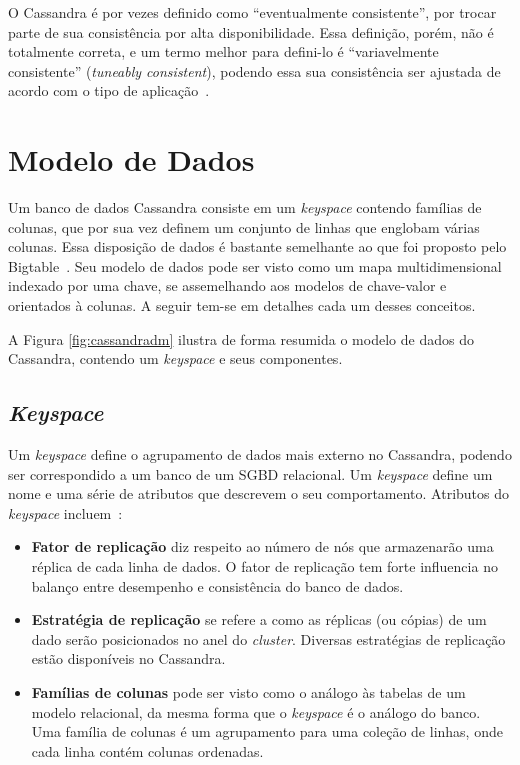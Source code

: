 O Cassandra é por vezes definido como \enquote{eventualmente consistente}, por trocar parte de sua consistência por alta disponibilidade. Essa definição, porém, não é totalmente correta, e um termo melhor para defini-lo é \enquote{variavelmente consistente} (\emph{tuneably consistent}), podendo essa sua consistência ser ajustada de acordo com o tipo de aplicação~\cite{cassandraguide}.

\section{Modelo de Dados}

Um banco de dados Cassandra consiste em um \emph{keyspace} contendo famílias de colunas, que por sua vez definem um conjunto de linhas que englobam várias colunas. Essa disposição de dados é bastante semelhante ao que foi proposto pelo Bigtable~\cite{lakshmancassandra, bigtable}. Seu modelo de dados pode ser visto como um mapa multidimensional indexado por uma chave, se assemelhando aos modelos de chave-valor e orientados à colunas. A seguir tem-se em detalhes cada um desses conceitos.

A Figura \ref{fig:cassandradm} ilustra de forma resumida o modelo de dados do Cassandra, contendo um \emph{keyspace} e seus componentes. 


\subsection*{\emph{Keyspace}}
Um \emph{keyspace} define o agrupamento de dados mais externo no Cassandra, podendo ser correspondido a um banco de um SGBD relacional. Um \emph{keyspace} define um nome e uma série de atributos que descrevem o seu comportamento. 
Atributos do \emph{keyspace} incluem~\cite{cassandraguide}:
\begin{itemize}
\item \textbf{Fator de replicação} diz respeito ao número de nós que armazenarão uma réplica de cada linha de dados. O fator de replicação tem forte influencia no balanço entre desempenho e consistência do banco de dados.
\item \textbf{Estratégia de replicação} se refere a como as réplicas (ou cópias) de um dado serão posicionados no anel do \emph{cluster}. Diversas estratégias de replicação estão disponíveis no Cassandra.
\item \textbf{Famílias de colunas} pode ser visto como o análogo às tabelas de um modelo relacional, da mesma forma que o \emph{keyspace} é o análogo do banco.  Uma família de colunas é um agrupamento para uma coleção de linhas, onde cada linha contém colunas ordenadas.
\end{itemize}



